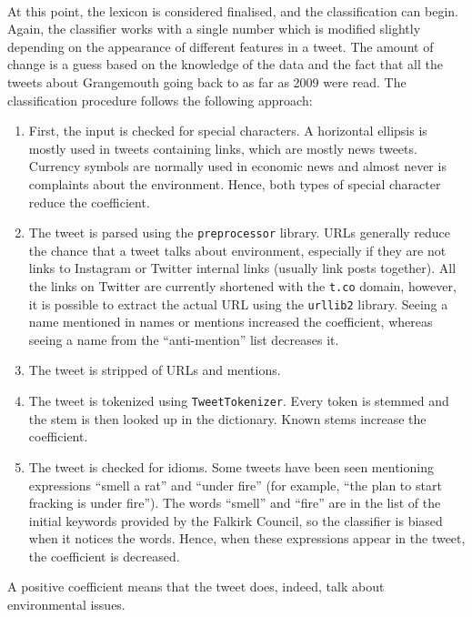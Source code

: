 \paragraph{}
At this point, the lexicon is considered finalised, and the classification can begin. Again, the classifier works with a single number which is modified slightly depending on the appearance of different features in a tweet. The amount of change is a guess based on the knowledge of the data and the fact that all the tweets about Grangemouth going back to as far as 2009 were read.
The classification procedure follows the following approach:
\begin{enumerate}
    \item First, the input is checked for special characters. A horizontal ellipsis is mostly used in tweets containing links, which are mostly news tweets. Currency symbols are normally used in economic news and almost never is complaints about the environment. Hence, both types of special character reduce the coefficient.
    \item The tweet is parsed using the \texttt{preprocessor} library. URLs generally reduce the chance that a tweet talks about environment, especially if they are not links to Instagram or Twitter internal links (usually link posts together). All the links on Twitter are currently shortened with the \texttt{t.co} domain, however, it is possible to extract the actual URL using the \texttt{urllib2} library. Seeing a name mentioned in names or mentions increased the coefficient, whereas seeing a name from the ``anti-mention'' list decreases it.
    \item The tweet is stripped of URLs and mentions.
    \item The tweet is tokenized using \texttt{TweetTokenizer}. Every token is stemmed and the stem is then looked up in the dictionary. Known stems increase the coefficient.
    \item The tweet is checked for idioms. Some tweets have been seen mentioning expressions ``smell a rat'' and ``under fire'' (for example, ``the plan to start fracking is under fire''). The words ``smell'' and ``fire'' are in the list of the initial keywords provided by the Falkirk Council, so the classifier is biased when it notices the words. Hence, when these expressions appear in the tweet, the coefficient is decreased. 
\end{enumerate}

A positive coefficient means that the tweet does, indeed, talk about environmental issues. 
